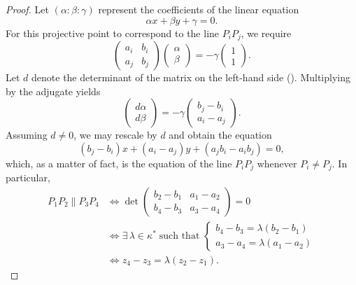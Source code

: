 \begin{proof}
    Let $(\alpha : \beta : \gamma)$ represent the coefficients of the linear equation
    \[
        \alpha x + \beta y + \gamma = 0.
    \]
    For this projective point to correspond to the line $P_iP_j$, we require
    \[
        \begin{pmatrix}
            a_i & b_i \\
            a_j & b_j
        \end{pmatrix}
        \begin{pmatrix}
            \alpha \\
            \beta
        \end{pmatrix}
        =
        -\gamma
        \begin{pmatrix}
            1 \\
            1
        \end{pmatrix}.
    \]
    Let $d$ denote the determinant of the matrix on the left-hand side (\lhs). Multiplying by the adjugate yields
    \[
        \begin{pmatrix}
            d\alpha \\
            d\beta
        \end{pmatrix}
        =
        -\gamma
        \begin{pmatrix}
            b_j - b_i \\
            a_i - a_j
        \end{pmatrix}.
    \]
    Assuming $d \ne 0$, we may rescale by $d$ and obtain the equation
    \[
        (b_j - b_i)x + (a_i - a_j)y + (a_jb_i - a_ib_j) = 0,
    \]
    which, as a matter of fact, is the equation of the line $P_iP_j$ whenever $P_i \ne P_j$. In particular,
    \begin{align*}
        P_1P_2 \parallel P_3P_4
        &\iff
            \det\begin{pmatrix}
                b_2 - b_1 & a_1 - a_2 \\
                b_4 - b_3 & a_3 - a_4
            \end{pmatrix}
            = 0 \\
        &\iff\exists\,\lambda\in\kappa^*\;\text{such that }
            \begin{cases}
                b_4 - b_3 = \lambda(b_2 - b_1)\\
                a_3 - a_4 = \lambda(a_1 - a_2)
            \end{cases}\\
        &\iff z_4 - z_3 = \lambda(z_2 - z_1).
    \end{align*}
\end{proof}

